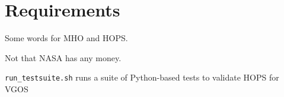 %
%
\section{Requirements}

Some words for \ac{MHO} and \ac{HOPS}.

Not that NASA has any money.

\begin{description}
 \texttt{run\_testsuite.sh} runs a suite of \ac{Python}-based
    tests to validate \ac{HOPS} for \ac{VGOS}
\end{description}

%
%
